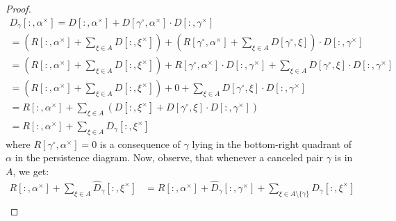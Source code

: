 \documentclass[10pt,a4paper]{amsart}
\newcommand{\bda}{\xi}
\newcommand{\bdb}{\gamma}
\newcommand{\bds}{\alpha}
\newcommand{\bth}[1]{#1^\circ}
\newcommand{\dth}[1]{#1^{\!\times}}
\newcommand{\mD}{D}
\newcommand{\mR}{R}
\begin{document}
\begin{proof}
\begin{align*}
    \mD_{\bdb}[:,\dth\bds] = \mD[:,\dth\bds] +  \mD[\bth\bdb,\dth\bds]\cdot \mD[:,\dth\bdb] \\
    = \left(\mR[:,\dth\bds] + \sum\limits_{\bda \in A} \mD[:,\dth\bda]\right) + \left(\mR[\bth\bdb,\dth\bds] +\sum\limits_{\bda \in A} \mD[\bth\bdb,\bda] \right) \cdot \mD[:,\dth\bdb] \\
     = \left(\mR[:,\dth\bds] + \sum\limits_{\bda \in A} \mD[:,\dth\bda]\right) + \mR[\bth\bdb,\dth\bds] \cdot \mD[:,\dth\bdb] +\sum\limits_{\bda \in A} \mD[\bth\bdb,\bda] \cdot \mD[:,\dth\bdb] \\
          = \left(\mR[:,\dth\bds] + \sum\limits_{\bda \in A} \mD[:,\dth\bda]\right) + 0 +\sum\limits_{\bda \in A} \mD[\bth\bdb,\bda] \cdot \mD[:,\dth\bdb] \\
        = \mR[:,\dth\bds] + \sum\limits_{\bda \in A}\left( \mD[:,\dth\bda]+\mD[\bth\bdb,\bda] \cdot \mD[:,\dth\bdb]\right)  \\
        = \mR[:,\dth\bds] + \sum\limits_{\bda \in A} \mD_{\bdb}[:,\dth\bda]
\end{align*}
where $\mR[\bth\bdb,\dth\bds] = 0$ is a consequence of $\bdb$ lying in the bottom-right quadrant of $\bds$ in the persistence diagram. Now, observe, that whenever a canceled pair $\bdb$ is in $A$, we get: 
\begin{align*}
     \mR[:,\dth\bds] + \sum\limits_{\bda \in A} \hat{\mD}_{\bdb}[:,\dth\bda] 
        &= \mR[:,\dth\bds] + \hat{\mD}_{\bdb}[:,\dth\bdb]+\sum\limits_{\bda \in A\setminus\{\bdb\}} \hat{\mD}_{\bdb}[:,\dth\bda] \\

\end{align*}
\end{proof}
\end{document}
